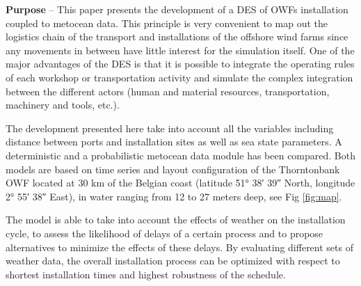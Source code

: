 \textbf{Purpose} --
This paper presents the development of a DES of OWFs installation coupled to metocean data. This principle is very convenient to map out the logistics chain of the transport and installations of the offshore wind farms since any movements in between have little interest for the simulation itself. One of the major advantages of the DES is that it is possible to integrate the operating rules of each workshop or transportation activity and simulate the complex integration between the different actors (human and material resources, transportation, machinery and tools, etc.). 

The development presented here take into account all the variables including distance between ports and installation sites as well as sea state parameters. A deterministic and a probabilistic metocean data module has been compared. Both models are based on time series and layout configuration of the Thorntonbank OWF located at 30 km of the Belgian coast (latitude 51° 38′ 39″ North, longitude 2° 55′ 38″ East), in water ranging from 12 to 27 meters deep, see Fig \ref{fig:map}.

The model is able to take into account the effects of weather on the installation cycle, to assess the likelihood of delays of a certain process and to propose alternatives to minimize the effects of these delays. By evaluating different sets of weather data, the overall installation process can be optimized with respect to shortest installation times and highest robustness of the schedule.



